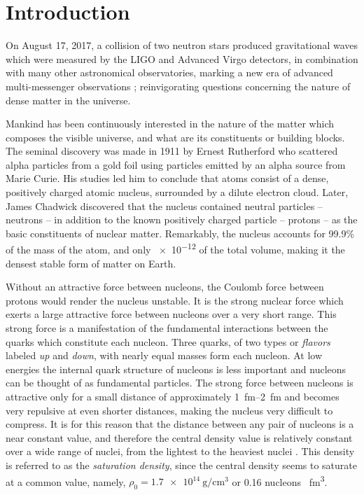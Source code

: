 \chapter{Introduction}
On August 17, 2017, a collision of two neutron stars produced gravitational waves which were measured by the LIGO and Advanced Virgo detectors, in combination with many other astronomical observatories, marking a new era of advanced multi-messenger observations \cite{ns_2017}; reinvigorating questions concerning the nature of dense matter in the universe.

Mankind has been continuously interested in the nature of the matter which composes the visible universe, and what are its constituents or building blocks. The seminal discovery was made in 1911 by Ernest Rutherford who scattered alpha particles from a gold foil using particles emitted by an alpha source from Marie Curie. His studies led him to conclude that atoms consist of a dense, positively charged atomic nucleus, surrounded by a dilute electron cloud. Later,  James Chadwick  discovered that the nucleus contained neutral particles -- neutrons  -- in addition to the known positively charged particle -- protons -- as the basic constituents of nuclear matter. Remarkably, the nucleus accounts for 99.9\% of the mass of the atom, and only \num{e-12} of the total volume, making it the densest stable form of matter on Earth. 

Without an attractive force between nucleons, the Coulomb force between protons would render the nucleus unstable. It is the strong nuclear force which exerts a large attractive force  between nucleons over a very short range. This strong force is a manifestation of the fundamental interactions between the quarks which constitute each nucleon. Three quarks, of two types or \emph{flavors} labeled \emph{up} and \emph{down}, with nearly equal masses form each nucleon. At low energies the internal quark structure of nucleons is less important and nucleons can be thought of as fundamental particles. The strong force between nucleons is attractive only for a small distance of approximately \SIrange{1}{2}{\femto\metre} and becomes very repulsive at even shorter distances, making the nucleus very difficult to compress. It is for this reason that the distance between any pair of nucleons is a near constant value, and therefore the central density value is relatively constant over a wide range of nuclei, from the lightest to the heaviest nuclei \cite{krane}. This density is referred to as the  \emph{saturation density}, since the central density seems to saturate at a common value, namely, $\rho_0 = \SI{1.7e14}{\gram\per\centi\metre\cubed}$ or \num{0.16} nucleons \si{\per\femto\metre\cubed}.  

